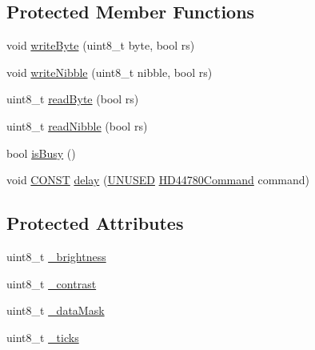 \subsection*{Protected Member Functions}
\begin{DoxyCompactItemize}
\item 
void \hyperlink{classflame_1_1_display___h_d44780___direct___connect_a6a9b905a7ab50b32fecaf3028c24480a}{write\-Byte} (uint8\-\_\-t byte, bool rs)
\item 
void \hyperlink{classflame_1_1_display___h_d44780___direct___connect_abe30b389fc500e03871f1b2e43f6d731}{write\-Nibble} (uint8\-\_\-t nibble, bool rs)
\item 
uint8\-\_\-t \hyperlink{classflame_1_1_display___h_d44780___direct___connect_a23bb25f11ab61c6080887782baf320f4}{read\-Byte} (bool rs)
\item 
uint8\-\_\-t \hyperlink{classflame_1_1_display___h_d44780___direct___connect_adc962056ee69c61e2c6e12f6ff977d66}{read\-Nibble} (bool rs)
\item 
bool \hyperlink{classflame_1_1_display___h_d44780___direct___connect_af998178c1527fd6f01a38e652aff664d}{is\-Busy} ()
\item 
void \hyperlink{io_8h_a0c33b494a68ce28497e7ce8e5e95feff}{C\-O\-N\-S\-T} \hyperlink{classflame_1_1_display___h_d44780___direct___connect_aafaff0728ce50365bf8b17ec659d9235}{delay} (\hyperlink{io_8h_addf5ec070e9499d36b7f2009ce736076}{U\-N\-U\-S\-E\-D} \hyperlink{namespaceflame_ad814bac19b0569ff480de071076a23e9}{H\-D44780\-Command} command)
\end{DoxyCompactItemize}
\subsection*{Protected Attributes}
\begin{DoxyCompactItemize}
\item 
uint8\-\_\-t \hyperlink{classflame_1_1_display___h_d44780___direct___connect_aa0454a004930d249cd3c13a54d5dc953}{\-\_\-brightness}
\item 
uint8\-\_\-t \hyperlink{classflame_1_1_display___h_d44780___direct___connect_a889e562f76f0f7d3299e55909f881f50}{\-\_\-contrast}
\item 
uint8\-\_\-t \hyperlink{classflame_1_1_display___h_d44780___direct___connect_a81a099e0fea9395ebf8559e10280015f}{\-\_\-data\-Mask}
\item 
uint8\-\_\-t \hyperlink{classflame_1_1_display___h_d44780___direct___connect_a25ab255622804e4bf62ee318bc4d932e}{\-\_\-ticks}
\end{DoxyCompactItemize}


